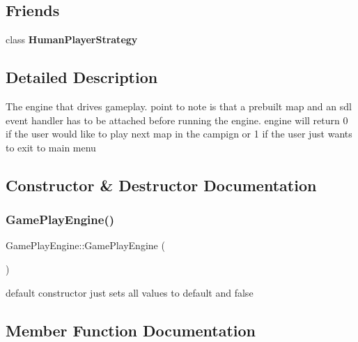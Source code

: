 \subsection*{Friends}
\begin{DoxyCompactItemize}
\item 
\hypertarget{class_game_play_engine_af251d517ea273e1d216cf0adfbff7e46}{}\label{class_game_play_engine_af251d517ea273e1d216cf0adfbff7e46} 
class {\bfseries Human\+Player\+Strategy}
\end{DoxyCompactItemize}


\subsection{Detailed Description}
The engine that drives gameplay. point to note is that a prebuilt map and an sdl event handler has to be attached before running the engine. engine will return 0 if the user would like to play next map in the campign or 1 if the user just wants to exit to main menu 

\subsection{Constructor \& Destructor Documentation}
\hypertarget{class_game_play_engine_af4b9d34e0404f1eadec2de8050b35612}{}\label{class_game_play_engine_af4b9d34e0404f1eadec2de8050b35612} 
\subsubsection{\texorpdfstring{Game\+Play\+Engine()}{GamePlayEngine()}}
{\footnotesize\ttfamily Game\+Play\+Engine\+::\+Game\+Play\+Engine (\begin{DoxyParamCaption}{ }\end{DoxyParamCaption})}

default constructor just sets all values to default and false 

\subsection{Member Function Documentation}
\hypertarget{class_game_play_engine_a300998530f28b86679ced3b42b6ccf62}{}\label{class_game_play_engine_a300998530f28b86679ced3b42b6ccf62} 
